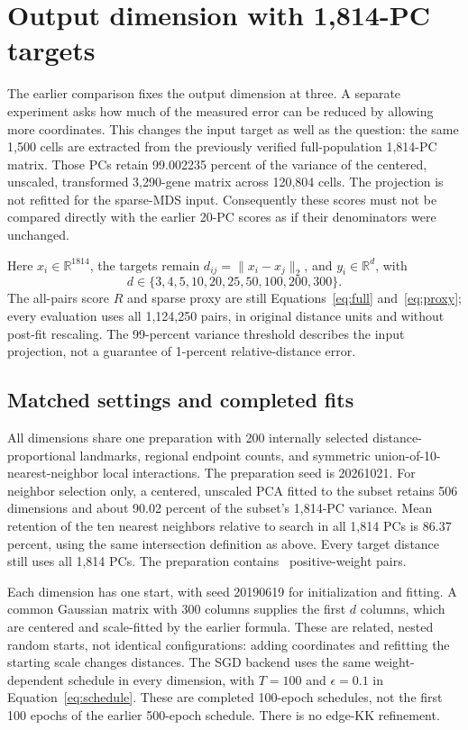 \section{Output dimension with 1,814-PC targets}\label{sec:dimension}
The earlier comparison fixes the output dimension at three. A separate
experiment asks how much of the measured error can be reduced by allowing
more coordinates. This changes the input target as well as the question:
the same 1,500 cells are extracted from the previously verified
full-population 1,814-PC matrix. Those PCs retain 99.002235 percent of the
variance of the centered, unscaled, transformed 3,290-gene matrix across
120,804 cells. The projection is not refitted for the sparse-MDS input.
Consequently these scores must not be compared directly with the earlier
20-PC scores as if their denominators were unchanged.

Here $x_i\in\mathbb R^{1814}$, the targets remain
$d_{ij}=\|x_i-x_j\|_2$, and $y_i\in\mathbb R^d$, with
\[
d\in\{3,4,5,10,20,25,50,100,200,300\}.
\]
The all-pairs score $R$ and sparse proxy are still
Equations~\eqref{eq:full} and~\eqref{eq:proxy}; every evaluation uses all
1,124,250 pairs, in original distance units and without post-fit rescaling.
The 99-percent variance threshold describes the input projection, not a
guarantee of 1-percent relative-distance error.

\subsection{Matched settings and completed fits}
All dimensions share one preparation with 200 internally selected
distance-proportional landmarks, regional endpoint counts, and symmetric
union-of-10-nearest-neighbor local interactions. The preparation seed is
20261021. For neighbor selection only, a centered, unscaled PCA fitted to
the subset retains 506 dimensions and about 90.02 percent of the subset's
1,814-PC variance. Mean retention of the ten nearest neighbors relative
to search in all 1,814 PCs is 86.37 percent, using the same intersection
definition as above. Every target distance still uses all 1,814 PCs.
The preparation contains \dimensionfittedpairs\ positive-weight pairs.

Each dimension has one start, with seed 20190619 for initialization and
fitting. A common Gaussian matrix with 300 columns supplies the first $d$
columns, which are centered and scale-fitted by the earlier formula.
These are related, nested random starts, not identical configurations:
adding coordinates and refitting the starting scale changes distances.
The SGD backend uses the same weight-dependent schedule in every dimension,
with $T=100$ and $\epsilon=0.1$ in Equation~\eqref{eq:schedule}.
These are completed 100-epoch schedules, not the first 100 epochs of the
earlier 500-epoch schedule. There is no edge-KK refinement.

